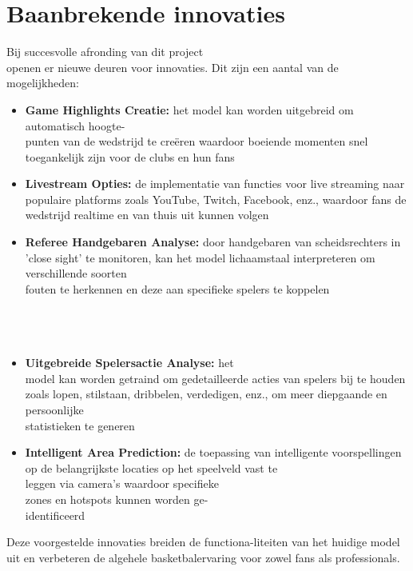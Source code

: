\section{Baanbrekende innovaties}
\label{sec:vooruitstrevende_veranderingen}
Bij succesvolle afronding van dit project \\openen er nieuwe deuren voor innovaties. Dit zijn een aantal van de mogelijkheden:
\begin{itemize}
    \item \textbf{Game Highlights Creatie:} het model kan worden uitgebreid om automatisch hoogte-\\punten van de wedstrijd te creëren waardoor boeiende momenten snel toegankelijk zijn voor de clubs en hun fans
    \item \textbf{Livestream Opties:} de implementatie van functies voor live streaming naar populaire platforms zoals YouTube, Twitch, Facebook, enz., waardoor fans de wedstrijd realtime en van thuis uit kunnen volgen
    \item \textbf{Referee Handgebaren Analyse:} door handgebaren van scheidsrechters in 'close sight' te monitoren, kan het model lichaamstaal interpreteren om verschillende soorten \\fouten te herkennen en deze aan specifieke spelers te koppelen\\\\\\\\
    \item \textbf{Uitgebreide Spelersactie Analyse:} het \\model kan worden getraind om gedetailleerde acties van spelers bij te houden zoals lopen, stilstaan, dribbelen, verdedigen, enz., om meer diepgaande en persoonlijke \\statistieken te generen
    \item \textbf{Intelligent Area Prediction:} de toepassing van intelligente voorspellingen op de belangrijkste locaties op het speelveld vast te \\leggen via camera's waardoor specifieke \\zones en hotspots kunnen worden ge-\\identificeerd
\end{itemize}
Deze voorgestelde innovaties breiden de functiona-liteiten van het huidige model uit en verbeteren de algehele basketbalervaring voor zowel fans als professionals.\\




